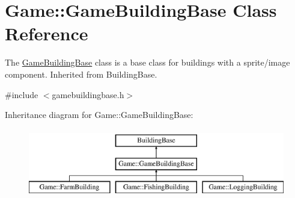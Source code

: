 \hypertarget{class_game_1_1_game_building_base}{\section{Game\-:\-:Game\-Building\-Base Class Reference}
\label{class_game_1_1_game_building_base}
}


The \hyperlink{class_game_1_1_game_building_base}{Game\-Building\-Base} class is a base class for buildings with a sprite/image component. Inherited from Building\-Base.  




{\ttfamily \#include $<$gamebuildingbase.\-h$>$}

Inheritance diagram for Game\-:\-:Game\-Building\-Base\-:\begin{figure}[H]
\begin{center}
\leavevmode
\includegraphics[height=3.000000cm]{class_game_1_1_game_building_base}
\end{center}
\end{figure}
